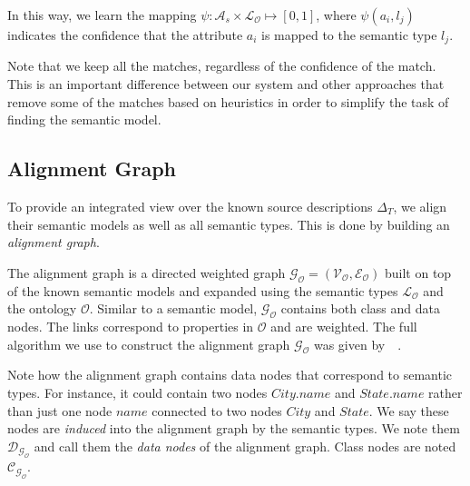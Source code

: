 \documentclass[letterpaper]{article} %
\newcommand{\authornote}[3]{
  {\fbox{\sc 
  #1}:$\blacktriangleright$\textcolor{#2}{\small{#3}}$\blacktriangleleft$}%
}
\newcommand{\ddg}[1]{\authornote{DDG}{blue}{#1}}
\newcommand{\npr}[1]{\authornote{NPR}{orange}{#1}}
\newcommand{\forijcai}[1]{}
\newcommand{\citeasnoun}[1]{\citeauthor{#1}~\shortcite{#1}}
\begin{document}
In this way, we learn the mapping $\psi : \mathcal{A}_s \times \mathcal{L_O} 
\mapsto [0, 1]$,
where $\psi(a_i,l_j)$ indicates the confidence that the attribute $a_i$ is 
mapped to the semantic type $l_j$.

Note that we keep all the matches, regardless of the confidence of the match. 
This is an important difference between our system and other approaches 
\cite{taheriyan2016learning} that 
remove some of the matches based on heuristics in order to simplify the task of 
finding the semantic model. 



\subsection{Alignment Graph}

To provide an integrated view over the known source descriptions $\Delta_T$, we 
align their semantic models as well as all semantic 
types. 
This is done by building an \emph{alignment graph}. 

The alignment graph is a directed weighted graph $\mathcal{G_O} = 
(\mathcal{V_O},\mathcal{E_O})$ built on top 
of the known semantic models and expanded using the semantic types 
$\mathcal{L_O}$ and the ontology $\mathcal{O}$. 
Similar to a semantic 
model, $\mathcal{G_O}$ contains both class and data nodes.
The links correspond 
to properties in  $\mathcal{O}$ and are weighted.
The full algorithm we use to construct the alignment graph 
$\mathcal{G_O}$ was given by~\citeasnoun{taheriyan2016learning}.
\forijcai{Briefly, it has three parts:
$(i)$ %
adding the known semantic models,
$(ii)$ %
adding the semantic types learned for the target source,
$(iii)$ expanding the graph using the domain ontology.
}

Note how the alignment graph contains data nodes that correspond to semantic types. 
For instance, it could contain two nodes $City.name$ and $State.name$ rather than just one node $name$ connected to two 
nodes $City$ and $State$. 
We say these nodes are \emph{induced} into the 
alignment graph by the semantic types.
We note them $\mathcal{D_{G_O}}$ and call them the \emph{data nodes} of the alignment graph.
Class nodes are noted $\mathcal{C_{G_O}}$.
\end{document}
